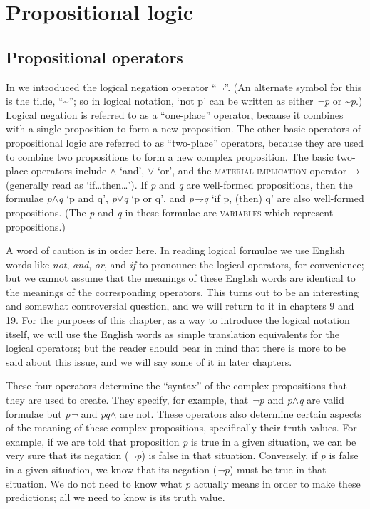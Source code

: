\section{Propositional logic}\label{sec:4.3}
\subsection{Propositional operators}\label{sec:4.3.1}

In  we introduced the logical negation operator “¬”. (An alternate symbol for this is the tilde, “{\textasciitilde}”; so in logical notation, ‘not p’ can be written as either \textit{¬p} or {\textasciitilde}\textit{p}.) Logical negation is referred to as a “one-place” operator, because it combines with a single proposition to form a new proposition. The other basic operators of propositional logic are referred to as “two-place” operators, because they are used to combine two propositions to form a new complex proposition. The basic two-place operators include $\wedge$ ‘and’, $\vee$ ‘or’, and the \textsc{material} \textsc{implication} operator → (generally read as ‘if…then…’). If \textit{p} and \textit{q} are well-formed propositions, then the formulae \textit{p$\wedge$}\textit{q} ‘p and q’, \textit{p$\vee$}\textit{q} ‘p or q’, and \textit{p→}\textit{q} ‘if p, (then) q’ are also well-formed propositions. (The \textit{p} and \textit{q} in these formulae are \textsc{variables} which represent propositions.)



A word of caution is in order here. In reading logical formulae we use English words like \textit{not}, \textit{and}, \textit{or}, and \textit{if} to pronounce the logical operators, for convenience; but we cannot assume that the meanings of these English words are identical to the meanings of the corresponding operators. This turns out to be an interesting and somewhat controversial question, and we will return to it in chapters 9 and 19. For the purposes of this chapter, as a way to introduce the logical notation itself, we will use the English words as simple translation equivalents for the logical operators; but the reader should bear in mind that there is more to be said about this issue, and we will say some of it in later chapters.



These four operators determine the “syntax” of the complex propositions that they are used to create. They specify, for example, that \textit{¬p} and \textit{p$\wedge$}\textit{q} are valid formulae but \textit{p¬} and \textit{pq$\wedge$} are not. These operators also determine certain aspects of the meaning of these complex propositions, specifically their truth values. For example, if we are told that proposition \textit{p} is true in a given situation, we can be very sure that its negation (\textit{¬p}) is false in that situation. Conversely, if \textit{p} is false in a given situation, we know that its negation (\textit{¬p}) must be true in that situation. We do not need to know what \textit{p} actually means in order to make these predictions; all we need to know is its truth value.



